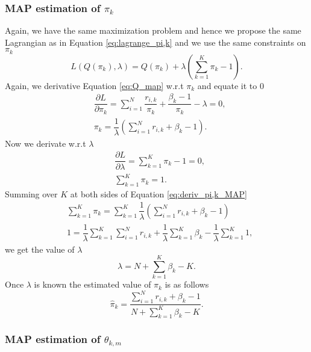 \documentclass[12pt]{article}
\begin{document}
\subsubsection{MAP estimation of $\pi_{k}$}

\noindent Again, we have the same maximization problem and hence we propose the same Lagrangian as in Equation \ref{eq:lagrange_pi,k} and we use the same constraints on $\pi_k$
\begin{equation}
L\left( Q(\pi_{k}),\lambda \right) = Q(\pi_{k}) + \lambda \left( \sum \limits_{k=1}^{K} \pi_{k} - 1 \right).
\end{equation}
Again, we derivative Equation \ref{eq:Q_map} w.r.t $\pi_{k}$ and equate it to 0
\begin{align}
& \dfrac{\partial L}{\partial \pi_{k}} =  \sum \limits_{i=1}^{N} \dfrac{r_{i,k}}{\pi_{k}} + \dfrac{\beta_{k}-1}{\pi_k} - \lambda = 0 ,\\
& \pi_{k} = \dfrac{1}{\lambda} \left( \sum \limits_{i=1}^{N} r_{i,k} + \beta_{k} - 1\right)\label{eq:deriv_pi,k_MAP}.
\end{align}
Now we derivate w.r.t $\lambda$
\begin{align}
& \dfrac{\partial L}{\partial \lambda} = \sum \limits_{k=1}^{K} \pi_{k} - 1 = 0 , \\
& \sum \limits_{k=1}^{K} \pi_{k} = 1.
\end{align}
Summing over $K$ at both sides of Equation \ref{eq:deriv_pi,k_MAP}
\begin{align}
& \sum \limits_{k=1}^{K}\pi_{k} = \sum \limits_{k=1}^{K} \dfrac{1}{\lambda} \left( \sum \limits_{i=1}^{N} r_{i,k} + \beta_{k} - 1\right)\\
& 1 = \dfrac{1}{\lambda} \sum \limits_{k=1}^{K} \sum \limits_{i=1}^{N} r_{i,k} + \dfrac{1}{\lambda} \sum \limits_{k=1}^{K} \beta_{k} - \dfrac{1}{\lambda} \sum \limits_{k=1}^{K} 1,
\end{align}
we get the value of $\lambda$
\begin{equation}
\lambda = N + \sum \limits_{k=1}^{K} \beta_{k} - K.
\end{equation}
Once $\lambda$ is known the estimated value of $\pi_{k}$ is as follows
\begin{equation}
\hat{\pi}_{k} = \dfrac{\sum \limits_{i=1}^{N} r_{i,k} + \beta_{k} - 1}{N + \sum \limits_{k=1}^{K} \beta_{k} - K}.
\end{equation}

\subsubsection{MAP estimation of $\theta_{k,m}$}
\end{document}
